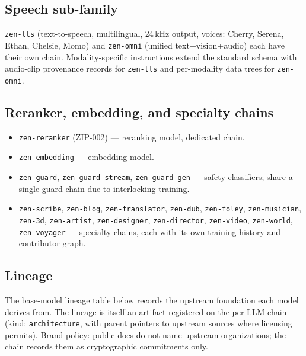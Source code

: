 \subsection{Speech sub-family}

\texttt{zen-tts} (text-to-speech, multilingual, 24\,kHz output, voices: Cherry, Serena, Ethan, Chelsie, Momo) and \texttt{zen-omni} (unified text+vision+audio) each have their own chain. Modality-specific instructions extend the standard schema with audio-clip provenance records for \texttt{zen-tts} and per-modality data trees for \texttt{zen-omni}.

\subsection{Reranker, embedding, and specialty chains}

\begin{itemize}[nosep]
\item \texttt{zen-reranker} (ZIP-002) --- reranking model, dedicated chain.
\item \texttt{zen-embedding} --- embedding model.
\item \texttt{zen-guard}, \texttt{zen-guard-stream}, \texttt{zen-guard-gen} --- safety classifiers; share a single guard chain due to interlocking training.
\item \texttt{zen-scribe}, \texttt{zen-blog}, \texttt{zen-translator}, \texttt{zen-dub}, \texttt{zen-foley}, \texttt{zen-musician}, \texttt{zen-3d}, \texttt{zen-artist}, \texttt{zen-designer}, \texttt{zen-director}, \texttt{zen-video}, \texttt{zen-world}, \texttt{zen-voyager} --- specialty chains, each with its own training history and contributor graph.
\end{itemize}

\subsection{Lineage}

The base-model lineage table below records the upstream foundation each \Zen{} model derives from. The lineage is itself an artifact registered on the per-LLM chain (kind: \texttt{architecture}, with parent pointers to upstream sources where licensing permits). Brand policy: public docs do not name upstream organizations; the chain records them as cryptographic commitments only.

